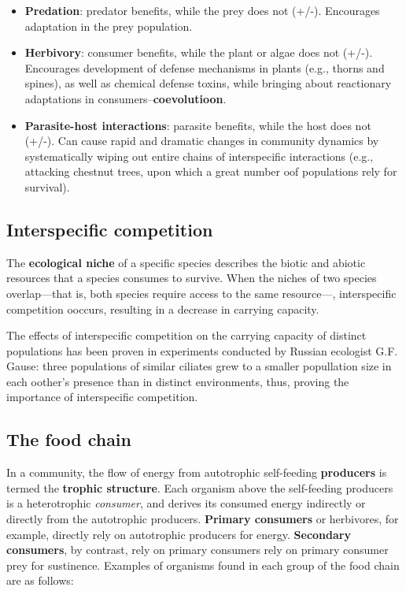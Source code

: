 \documentclass{article}
\begin{document}
\begin{itemize}
	\item \textbf{Predation}: predator benefits, while the prey does not (+/-). Encourages adaptation in the
	prey population.
	\item \textbf{Herbivory}: consumer benefits, while the plant or algae does not (+/-). Encourages
	development of defense mechanisms in plants (e.g., thorns and spines), as well as chemical defense toxins,
	while bringing about reactionary adaptations in consumers--\textbf{coevolutioon}.
	\item \textbf{Parasite-host interactions}: parasite benefits, while the host does not (+/-). Can cause
	rapid and dramatic changes in community dynamics by systematically wiping out entire chains of
	interspecific interactions (e.g., attacking chestnut trees, upon which a great number oof populations
	rely for survival).
\end{itemize}

\subsection{Interspecific competition}

The \textbf{ecological niche} of a specific species describes the biotic and abiotic resources that a species
consumes to survive. When the niches of two species overlap---that is, both species require access to the same
resource---, interspecific competition ooccurs, resulting in a decrease in carrying capacity.

The effects of interspecific competition on the carrying capacity of distinct populations has been proven in
experiments conducted by Russian ecologist G.F. Gause: three populations of similar ciliates grew to a smaller
popullation size in each oother's presence than in distinct environments, thus, proving the importance of
interspecific competition.

\subsection{The food chain}

In a community, the flow of energy from autotrophic self-feeding
\textbf{producers} is termed the \textbf{trophic structure}. Each organism above
the self-feeding producers is a heterotrophic \emph{consumer}, and derives its
consumed energy indirectly or directly from the autotrophic producers.
\textbf{Primary consumers} or herbivores, for example, directly rely on
autotrophic producers for energy. \textbf{Secondary consumers}, by contrast,
rely on primary consumers rely on primary consumer prey for sustinence. Examples
of organisms found in each group of the food chain are as follows:
\end{document}
